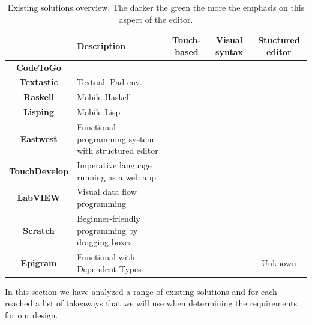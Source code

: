 \begin{table}[ht]
{\renewcommand{\arraystretch}{2}%
\begin{tabularx}{\textwidth{}}{|c|X|c|c|c|}
\hline
	& \textbf{Description}
	& \textbf{Touch-based}                                              
	& \textbf{Visual syntax}                          
	& \textbf{Stuctured editor} 
\\ \hline
	\textbf{CodeToGo} & & \cellcolor[HTML]{B6D7A8}{\color[HTML]{9AFF99} }                  & & \\ \cline{1-1}
	\textbf{Textastic}  & \multirow{-2}{*}{
	Textual iPad env.
	} & \multirow{-2}{*}{\cellcolor[HTML]{B6D7A8}{\color[HTML]{9AFF99} }} & \multirow{-2}{*}{}                              & \multirow{-2}{*}{}                                                   
\\ \hline
	\textbf{Raskell}      & 
		Mobile Haskell & \cellcolor[HTML]{B6D7A8}{\color[HTML]{9AFF99} } & &                                                               
\\ \hline
	\textbf{Lisping}      & 
		Mobile Lisp & \cellcolor[HTML]{6AA84F} & & \cellcolor[HTML]{B6D7A8}

\\ \hline
	\textbf{Eastwest}     & 
		Functional programming system with structured editor
		 & & & \cellcolor[HTML]{274E13}
\\ \hline	
	\textbf{TouchDevelop} & 
		Imperative language running as a web app
		 & \cellcolor[HTML]{6AA84F} & & \cellcolor[HTML]{B6D7A8} 
\\ \hline		
	\textbf{LabVIEW}      & 
		Visual data flow programming & & \cellcolor[HTML]{38761D} & \cellcolor[HTML]{6AA84F}
\\ \hline
	\textbf{Scratch}      & 
		Beginner-friendly programming by dragging boxes
		  & & \cellcolor[HTML]{274E13} & \cellcolor[HTML]{274E13}
\\ \hline
	\textbf{Epigram}      & 
		Functional with Dependent Types & & \cellcolor[HTML]{6AA84F} & Unknown
\\ \hline
\end{tabularx}
}
\caption{Existing solutions overview. The darker the green the more the
emphasis on this aspect of the editor.}
\label{table:existing_solutions_overview}
\end{table}

In this section we have analyzed a range of existing solutions and for each reached a list of takeaways that we will use when determining the requirements for our design.

